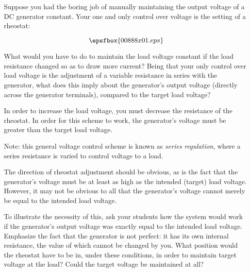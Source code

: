

Suppose you had the boring job of manually maintaining the output voltage of a DC generator constant.  Your one and only control over voltage is the setting of a rheostat:

$$\epsfbox{00888x01.eps}$$

What would you have to do to maintain the load voltage constant if the load resistance changed so as to draw more current?  Being that your only control over load voltage is the adjustment of a variable resistance in series with the generator, what does this imply about the generator's output voltage (directly across the generator terminals), compared to the target load voltage?







In order to increase the load voltage, you must decrease the resistance of the rheostat.  In order for this scheme to work, the generator's voltage must be greater than the target load voltage.

Note: this general voltage control scheme is known as {\it series regulation}, where a series resistance is varied to control voltage to a load.







The direction of rheostat adjustment should be obvious, as is the fact that the generator's voltage must be at least as high as the intended (target) load voltage.  However, it may not be obvious to all that the generator's voltage cannot merely be equal to the intended load voltage.

To illustrate the necessity of this, ask your students how the system would work if the generator's output voltage was exactly equal to the intended load voltage.  Emphasize the fact that the generator is not perfect: it has its own internal resistance, the value of which cannot be changed by you.  What position would the rheostat have to be in, under these conditions, in order to maintain target voltage at the load?  Could the target voltage be maintained at all?




